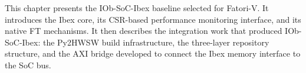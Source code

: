 This chapter presents the IOb-SoC-Ibex baseline selected for \ac{Fatori-V}. It introduces the Ibex core, its \ac{CSR}-based performance monitoring interface, and its native \ac{FT} mechanisms. It then describes the integration work that produced IOb-SoC-Ibex: the Py2HWSW build infrastructure, the three-layer repository structure, and the \ac{AXI} bridge developed to connect the Ibex memory interface to the \ac{SoC} bus.
